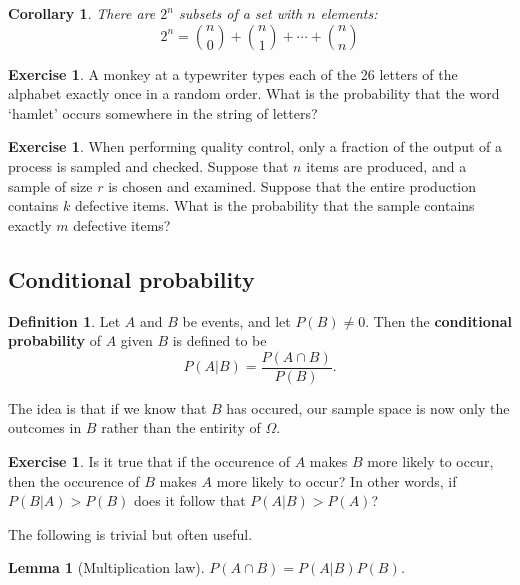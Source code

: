 \documentclass[a4paper,leqno]{article}
\numberwithin{equation}{section}
\newtheorem{lem}[equation]{Lemma}
\newtheorem{cor}[equation]{Corollary}
\theoremstyle{definition}
\newtheorem{defn}[equation]{Definition}
\newtheorem{exercise}[equation]{Exercise}
\theoremstyle{remark}
\newcommand{\df}{\textbf}
\newcommand{\inter}{\cap}
\begin{document}
\begin{cor}
  There are $ 2^n $ subsets of a set with $ n $ elements:
  \begin{displaymath}
    2^n = \binom{n}{0} + \binom{n}{1} + \cdots + \binom{n}{n}
  \end{displaymath}
\end{cor}

\begin{exercise}
  A monkey at a typewriter types each of the 26 letters of the alphabet exactly once in a random order. What is
  the probability that the word `hamlet' occurs somewhere in the string of letters?
\end{exercise}

\begin{exercise}
  When performing quality control, only a fraction of the output of a process is sampled and checked.
  Suppose that $ n $ items are produced, and a sample of size $ r $ is chosen and examined. Suppose that the
  entire production contains $ k $ defective items. What is the probability that the sample contains
  exactly $ m $ defective items?
\end{exercise}

\subsection{Conditional probability}
\begin{defn}
  Let $ A $ and $ B $ be events, and let $ P(B) \neq 0 $. Then the \df{conditional probability} of $ A $ given $ B $ is defined to be
  \begin{displaymath}
    P(A | B) = \frac{P(A \inter B)}{P(B)}.
  \end{displaymath}
\end{defn}
The idea is that if we know that $ B $ has occured, our sample space is now only the outcomes in $ B $ rather than the entirity of $ \Omega $.

\begin{exercise}
  Is it true that if the occurence of $ A $ makes $ B $ more likely to occur, then the occurence of $ B $
  makes $ A $ more likely to occur? In other words, if $ P(B|A) > P(B) $ does it follow that $ P(A | B) > P(A) $?
\end{exercise}

The following is trivial but often useful.
\begin{lem}[Multiplication law]
  $ P(A \inter B) = P(A | B) P(B) $.
\end{lem}
\end{document}
